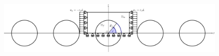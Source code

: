 \documentclass[first,firstsupp,lastsupp,last,hyperref,table]{ETHclass}
\begin{document}
\begin{frame}
\begin{columns}[c]
\begin{column}{0.5\textwidth}
\begin{figure}
\end{figure}
\end{column}
\end{columns}
\vspace{-0.4cm}
\centering
\begin{figure}
\centering
\includegraphics[width=\textwidth]{refAngle.pdf}
\end{figure}
\end{frame}

\addtocounter{framenumber}{-1}
\end{document}

